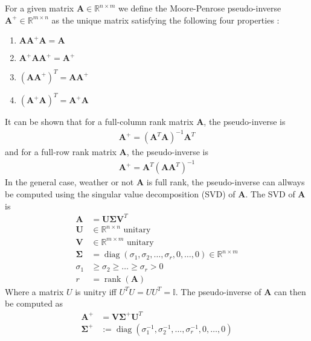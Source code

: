 For a given matrix $\bm{A} \in \mathbb{R}^{n\times m}$ we define the Moore-Penrose
pseudo-inverse $\bm{A}^{+} \in \mathbb{R}^{m\times n}$ as the unique matrix
satisfying the following four properties \cite{penrose1955}:
\begin{enumerate}
\item $\bm{A}\bm{A}^{+}\bm{A} = \bm{A}$
\item $\bm{A}^{+}\bm{A}\bm{A}^{+} = \bm{A}^{+}$
\item $(\bm{A}\bm{A}^{+})^T = \bm{A}\bm{A}^{+}$
\item $(\bm{A}^{+}\bm{A})^T = \bm{A}^{+}\bm{A}$
\end{enumerate}
It can be shown that for a full-column rank matrix $\bm{A}$, the pseudo-inverse is
\begin{align}
    \bm{A}^{+} = (\bm{A}^T \bm{A})^{-1} \bm{A}^T
\end{align}
and for a full-row rank matrix $\bm{A}$, the pseudo-inverse is
\begin{align}
    \bm{A}^{+} = \bm{A}^T (\bm{A} \bm{A}^T)^{-1}
\end{align}
In the general case, weather or not $\bm{A}$ is full rank, the pseudo-inverse can allways
be computed using the singular value decomposition (SVD) of $\bm{A}$. The SVD of $\bm{A}$ is
\begin{subequations}
\begin{align}
    \bm{A} &= \bm{U} \bm{\Sigma} \bm{V}^T \\
    \bm{U} &\in \mathbb{R}^{n\times n} \textrm{ unitary} \\
    \bm{V} &\in \mathbb{R}^{m\times m} \textrm{ unitary} \\
    \bm{\Sigma} &= \operatorname{diag}(\sigma_1, \sigma_2, \ldots, \sigma_r, 0, \ldots, 0) \in \mathbb{R}^{n\times m} \\
    \sigma_1 &\geq \sigma_2 \geq \ldots \geq \sigma_r > 0 \\
    r &= \operatorname{rank}(\bm{A})
\end{align}
\end{subequations}
Where a matrix $U$ is unitry iff $U^T U = U U^T = \mathbb{I}$. The pseudo-inverse
of $\bm{A}$ can then be computed as
\begin{subequations}
\begin{align}
    \bm{A}^{+} &= \bm{V} \bm{\Sigma}^{+} \bm{U}^T \\
    \bm{\Sigma}^{+} &:= \operatorname{diag}(\sigma_1^{-1}, \sigma_2^{-1}, \ldots, \sigma_r^{-1}, 0, \ldots, 0)
\end{align}
\end{subequations}

